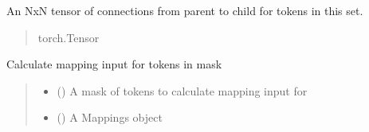 \documentclass[letterpaper,10pt,english]{sphinxmanual}
\begin{document}
\begin{fulllineitems}
\begin{fulllineitems}
\end{fulllineitems}


\begin{fulllineitems}
\label{\detokenize{nodes:nodes.nodeTensors.Recipient.connections}}
\pysigstartsignatures
\pysigline
{}
\pysigstopsignatures
\sphinxAtStartPar
An NxN tensor of connections from parent to child for tokens in this set.
\begin{quote}\begin{description}
\sphinxAtStartPar
torch.Tensor

\end{description}\end{quote}

\end{fulllineitems}


\begin{fulllineitems}
\label{\detokenize{nodes:nodes.nodeTensors.Recipient.map_input}}
\pysigstartsignatures
\pysiglinewithargsret
{}
{\sphinxparamcomma {}\sphinxparamcomma {}}
{}
\pysigstopsignatures
\sphinxAtStartPar
Calculate mapping input for tokens in mask
\begin{quote}\begin{description}
\begin{itemize}
\item {} 
\sphinxAtStartPar
{} () \textendash{} A mask of tokens to calculate mapping input for

\item {} 
\sphinxAtStartPar
{} ({\hyperref[\detokenize{nodes:nodes.nodeMemObjects.Mappings}]{}}) \textendash{} A Mappings object


\end{itemize}
\end{description}
\end{quote}
\end{fulllineitems}
\end{fulllineitems}
\end{document}

